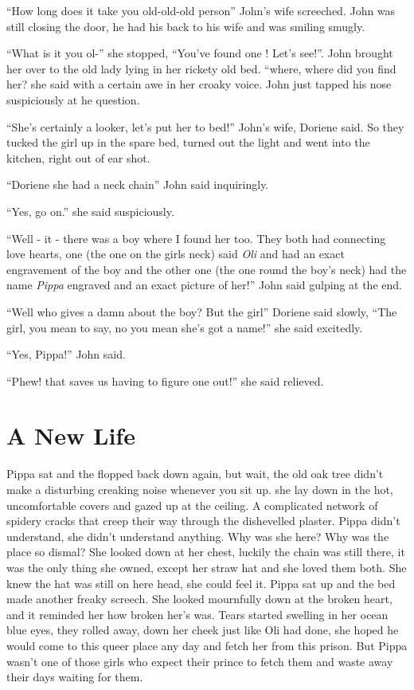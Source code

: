 ``How long does it take you old-old-old person'' John's wife screeched.
John was still closing the door, he had his back to his wife and was
smiling smugly.

``What is it you ol-'' she stopped, ``You've found one ! Let's see!''.
John brought her over to the old lady lying in her rickety old bed.
``where, where did you find her? she said with a certain awe in her
croaky voice. John just tapped his nose suspiciously at he question.

``She's certainly a looker, let's put her to bed!'' John's wife, Doriene
said. So they tucked the girl up in the spare bed, turned out the light
and went into the kitchen, right out of ear shot.

``Doriene she had a neck chain'' John said inquiringly.

``Yes, go on.'' she said suspiciously.

``Well - it - there was a boy where I found her too. They both had
connecting love hearts, one (the one on the girls neck) said \emph{Oli}
and had an exact engravement of the boy and the other one (the one round
the boy's neck) had the name \emph{Pippa} engraved and an exact picture
of her!'' John said gulping at the end.

``Well who gives a damn about the boy? But the girl'' Doriene said
slowly, ``The girl, you mean to say, no you mean she's got a name!'' she
said excitedly.

``Yes, Pippa!'' John said.

``Phew! that saves us having to figure one out!'' she said relieved.

\chapter{A New Life}

Pippa sat and the flopped back down again, but wait, the old oak tree
didn't make a disturbing creaking noise whenever you sit up. she lay
down in the hot, uncomfortable covers and gazed up at the ceiling. A
complicated network of spidery cracks that creep their way through the
dishevelled plaster. Pippa didn't understand, she didn't understand
anything. Why was she here? Why was the place so dismal? She looked down
at her chest, luckily the chain was still there, it was the only thing
she owned, except her straw hat and she loved them both. She knew the
hat was still on here head, she could feel it. Pippa sat up and the bed
made another freaky screech. She looked mournfully down at the broken
heart, and it reminded her how broken her's was. Tears started swelling
in her ocean blue eyes, they rolled away, down her cheek just like Oli
had done, she hoped he would come to this queer place any day and fetch
her from this prison. But Pippa wasn't one of those girls who expect
their prince to fetch them and waste away their days waiting for them.

